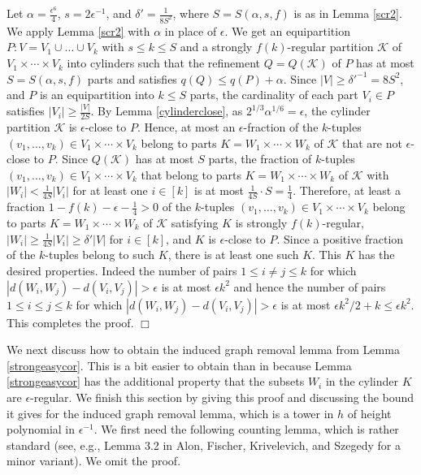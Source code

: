 \documentclass[11pt]{article}
\newenvironment{proof}
      {\medskip\noindent{\bf Proof:}\hspace{1mm}}
      {\hfill$\Box$\medskip}
\begin{document}
\begin{proof} Let $\alpha=\frac{\epsilon^6}{4}$, $s=2\epsilon^{-1}$, and $\delta'=\frac{1}{8S^2}$,
where $S=S(\alpha,s,f)$ is as in Lemma \ref{scr2}. We apply Lemma \ref{scr2} with
$\alpha$ in place of $\epsilon$. We get an equipartition $P:V=V_1 \cup \ldots
\cup V_k$ with $s \leq k \leq S$ and a strongly $f(k)$-regular partition $\mathcal{K}$ of $V_1 \times
\cdots \times V_k$ into cylinders such that the refinement $Q=Q(\mathcal{K})$
of $P$ has at most $S=S(\alpha, s, f)$ parts and satisfies $q(Q) \leq q(P)+\alpha$. 
Since $|V| \geq \delta'^{-1}=8S^2$, and $P$ is an equipartition into $k \leq S$ parts, the cardinality of each part $V_i \in P$ satisfies $|V_i| \geq \frac{|V|}{2S}$. By Lemma \ref{cylinderclose},  as $2^{1/3}\alpha^{1/6}=\epsilon$, the cylinder
partition $\mathcal{K}$ is $\epsilon$-close to $P$. Hence, at most an
$\epsilon$-fraction of the $k$-tuples $(v_1,\ldots,v_k) \in V_1 \times \cdots
\times V_k$ belong to parts $K=W_1 \times \cdots \times W_k$ of $\mathcal{K}$
that are not $\epsilon$-close to $P$. Since $Q(\mathcal{K})$ has at most $S$
parts, the fraction of $k$-tuples $(v_1,\ldots,v_k) \in V_1 \times \cdots
\times V_k$ that belong to parts $K=W_1 \times \cdots \times W_k$ of
$\mathcal{K}$ with $|W_i|<\frac{1}{4S} |V_i|$ for at least one $i \in [k]$ is at
most $\frac{1}{4S}  \cdot S = \frac{1}{4}$. Therefore, at least a fraction $1-f(k)-\epsilon-\frac{1}{4}>0$
of the $k$-tuples  $(v_1,\ldots,v_k) \in V_1 \times \cdots \times V_k$ belong
to parts $K=W_1 \times \cdots \times W_k$ of $\mathcal{K}$ satisfying $K$ is
strongly $f(k)$-regular,  $|W_i| \geq \frac{1}{4S} |V_i| \geq \delta'|V|$ for $i \in [k]$, and $K$
is $\epsilon$-close to $P$.  Since a positive fraction of the $k$-tuples belong
to such $K$, there is at least one such $K$. This $K$ has the desired
properties. Indeed the number of pairs $1 \leq i \not = j \leq k$ for which $|d(W_i,W_j)-d(V_i,V_j)| >
\epsilon$ is at most $\epsilon k^2$ and hence the number of pairs $1 \leq i \leq j \leq k$ for 
which $|d(W_i,W_j)-d(V_i,V_j)| > \epsilon$ is at most $\epsilon k^2/2+k \leq \epsilon k^2$. This completes the proof. 
\end{proof}

We next discuss how to obtain the induced graph removal lemma from Lemma
\ref{strongeasycor}. This is a bit easier to obtain than in \cite{AFKS} because
Lemma \ref{strongeasycor} has the additional property that the subsets $W_i$ in
the cylinder $K$ are $\epsilon$-regular. We finish this section by giving this
proof and discussing the bound it gives for the induced graph removal lemma,
which is a tower in $h$ of height polynomial in $\epsilon^{-1}$. We first need the
following counting lemma, which is rather standard (see, e.g., Lemma 3.2 in
Alon, Fischer, Krivelevich, and Szegedy \cite{AFKS} for a minor variant). We
omit the proof.
\end{document}
